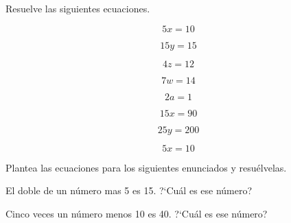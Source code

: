 \documentclass[11pt]{article}
\begin{document}
\vspace{7mm}
\setcounter{equation}{0}
Resuelve las siguientes ecuaciones.

\vspace{-5mm}
\begin{multicols}{2}

\begin{equation}    5x = 10     \end{equation}

\vspace{7mm}
\begin{equation}    15y = 15    \end{equation}

\vspace{7mm}
\begin{equation}    4z = 12     \end{equation}

\vspace{7mm}
\begin{equation}    7w = 14     \end{equation}

\vspace{7mm}
\begin{equation}    2a = 1      \end{equation}

\vspace{7mm}
\begin{equation}    15x = 90    \end{equation}

\vspace{7mm}
\begin{equation}    25y = 200   \end{equation}

\vspace{7mm}
\begin{equation}    5x = 10     \end{equation}

\vspace{7mm}
\end{multicols}

\newpage

Plantea las ecuaciones para los siguientes enunciados y resu\'elvelas. 

\vspace{5mm}

El doble de un n\'umero mas 5 es 15. ?`Cu\'al es ese n\'umero?

\vspace{2cm}
Cinco veces un n\'umero menos 10 es 40. ?`Cu\'al es ese n\'umero?
\end{document}

